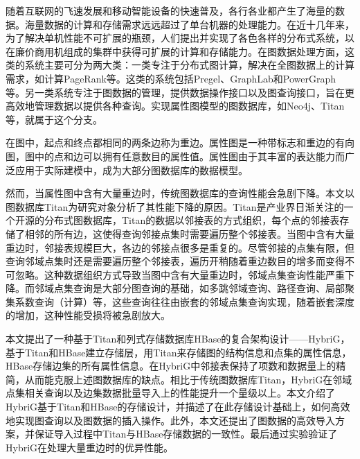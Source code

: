 
\begin{cabstract}
随着互联网的飞速发展和移动智能设备的快速普及，各行各业都产生了海量的数据。海量数据的计算和存储需求远远超过了单台机器的处理能力。在近十几年来，为了解决单机性能不可扩展的瓶颈，人们提出并实现了各色各样的分布式系统，以在廉价商用机组成的集群中获得可扩展的计算和存储能力。在图数据处理方面，这类的系统主要可分为两大类：一类专注于分布式图计算，解决在全图数据上的计算需求，如计算PageRank等。这类的系统包括Pregel、GraphLab和PowerGraph等。另一类系统专注于图数据的管理，提供数据操作接口以及图查询接口，旨在更高效地管理数据以提供各种查询。实现属性图模型的图数据库，如Neo4j、Titan等，就属于这个分支。

在图中，起点和终点都相同的两条边称为重边。属性图是一种带标志和重边的有向图，图中的点和边可以拥有任意数目的属性值。属性图由于其丰富的表达能力而广泛应用于实际建模中，成为大部分图数据库的数据模型。

然而，当属性图中含有大量重边时，传统图数据库的查询性能会急剧下降。本文以图数据库Titan为研究对象分析了其性能下降的原因。Titan是产业界日渐关注的一个开源的分布式图数据库，Titan的数据以邻接表的方式组织，每个点的邻接表存储了相邻的所有边，这使得查询邻接点集时需要遍历整个邻接表。当图中含有大量重边时，邻接表规模巨大，各边的邻接点很多是重复的。尽管邻接的点集有限，但查询邻域点集时还是需要遍历整个邻接表，遍历开稍随着重边数目的增多而变得不可忽略。这种数据组织方式导致当图中含有大量重边时，邻域点集查询性能严重下降。而邻域点集查询是大部分图查询的基础，如多跳邻域查询、路径查询、局部聚集系数查询（计算）等，这些查询往往由嵌套的邻域点集查询实现，随着嵌套深度的增加，这种性能受损将被急剧放大。

本文提出了一种基于Titan和列式存储数据库HBase的复合架构设计——HybriG，基于Titan和HBase建立存储层，用Titan来存储图的结构信息和点集的属性信息，HBase存储边集的所有属性信息。在HybriG中邻接表保持了项数和数据量上的精简，从而能克服上述图数据库的缺点。相比于传统图数据库Titan，HybriG在邻域点集相关查询以及边集数据批量导入上的性能提升一个量级以上。本文介绍了HybriG基于Titan和HBase的存储设计，并描述了在此存储设计基础上，如何高效地实现图查询以及图数据的插入操作。此外，本文还提出了图数据的高效导入方案，并保证导入过程中Titan与HBase存储数据的一致性。最后通过实验验证了HybriG在处理大量重边时的优异性能。

\end{cabstract}

